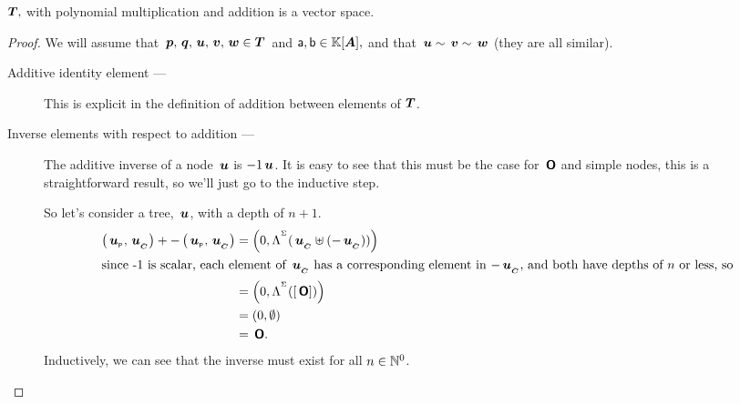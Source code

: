 \begin{proposition}\label{vspace}
  $\boldsymbol{T},$ with polynomial multiplication and addition is a vector space.
  \begin{proof}
    We will assume that $\,\boldsymbol{p}, \,\boldsymbol{q},
    \,\boldsymbol{u},\,\boldsymbol{v},\,\boldsymbol{w} \in \boldsymbol{T}$\ and $\mathsf{a}, \mathsf{b} \in
    \mathbb{K}[{\boldsymbol{A}}],$ and that $\,\boldsymbol{u} \sim \,\boldsymbol{v} \sim \,\boldsymbol{w}$ (they
    are all similar).

    \begin{description} 
    \item[Additive identity element --- ]

      This is explicit in the definition of addition between elements
      of $\boldsymbol{T}$.

    \item[Inverse elements with respect to addition --- ]

      The additive inverse of a node $\,\boldsymbol{u}$ is $-1\,\boldsymbol{u}$. It is easy to see that
      this must be the case for $\,\boldsymbol{\mathsf{O}}$ and simple nodes, this is a
      straightforward result, so we'll just go to the inductive step.

      So let's consider a tree, $\,\boldsymbol{u}$, with a depth of $n+1$.
      \begin{align*}
        \left({{\,\boldsymbol{u}}_{{}_{\mathsf{P}}}},{{\,\boldsymbol{u}}_{{}_{\bar{\boldsymbol{C}}}}}\right) + -\left({{\,\boldsymbol{u}}_{{}_{\mathsf{P}}}},{{\,\boldsymbol{u}}_{{}_{\bar{\boldsymbol{C}}}}}\right)&=\left({0},{\Lambda^{{}^{\Sigma}}({\,\boldsymbol{u}}_{{}_{\bar{\boldsymbol{C}}}}\uplus(-{\,\boldsymbol{u}}_{{}_{\bar{\boldsymbol{C}}}}))}\right) \\
        \intertext{since -1 is scalar, each element of ${\,\boldsymbol{u}}_{{}_{\bar{\boldsymbol{C}}}}$ has a corresponding element in $-{\,\boldsymbol{u}}_{{}_{\bar{\boldsymbol{C}}}}$, and both have depths of $n$ or less, so}
        &= \left({0},{\Lambda^{{}^{\Sigma}}([\,\boldsymbol{\mathsf{O}}])}\right)\\
        &=\left({0},{\emptyset}\right) \\
        &= \,\boldsymbol{\mathsf{O}}.
      \end{align*}
      Inductively, we can see that the inverse must exist for all $n\in\mathbb{N}^0$.




\end{description}
\end{proof}
\end{proposition}
